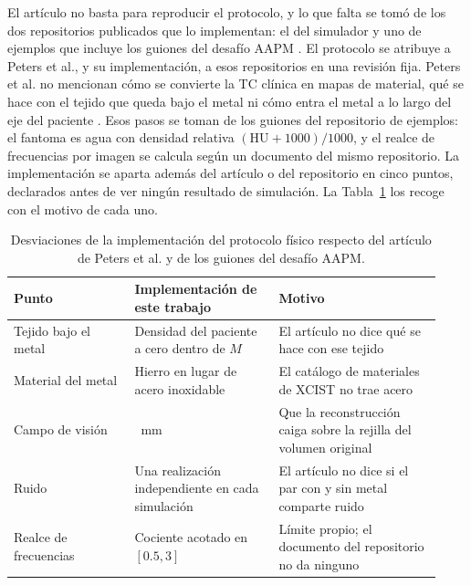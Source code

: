 El artículo no basta para reproducir el protocolo, y lo que falta se tomó de los dos repositorios publicados que lo implementan: el del simulador \cite{xcist2026main} y uno de ejemplos que incluye los guiones del desafío AAPM \cite{xcist2025example}. El protocolo se atribuye a Peters et al., y su implementación, a esos repositorios en una revisión fija. Peters et al. no mencionan cómo se convierte la TC clínica en mapas de material, qué se hace con el tejido que queda bajo el metal ni cómo entra el metal a lo largo del eje del paciente \cite{peters2025hybrid}. Esos pasos se toman de los guiones del repositorio de ejemplos: el fantoma es agua con densidad relativa $(\mathrm{HU} + 1000)/1000$, y el realce de frecuencias por imagen se calcula según un documento del mismo repositorio. La implementación se aparta además del artículo o del repositorio en cinco puntos, declarados antes de ver ningún resultado de simulación. La Tabla~\ref{tab:desviaciones} los recoge con el motivo de cada uno.

\begin{table}[htbp]
\centering
\small
\caption{Desviaciones de la implementación del protocolo físico respecto del artículo de Peters et al. y de los guiones del desafío AAPM.}
\label{tab:desviaciones}
\setlength{\tabcolsep}{5pt}\renewcommand{\arraystretch}{1.1}
\begin{tabular}{>{\raggedright\arraybackslash}p{0.262\linewidth} >{\raggedright\arraybackslash}p{0.3158\linewidth} >{\raggedright\arraybackslash}p{0.3509\linewidth}}
\hline
\textbf{Punto} & \textbf{Implementación de este trabajo} & \textbf{Motivo} \\
\hline
Tejido bajo el metal & Densidad del paciente a cero dentro de $M$ & El artículo no dice qué se hace con ese tejido \\
Material del metal & Hierro en lugar de acero inoxidable & El catálogo de materiales de XCIST no trae acero \\
Campo de visión & 459~mm & Que la reconstrucción caiga sobre la rejilla del volumen original \\
Ruido & Una realización independiente en cada simulación & El artículo no dice si el par con y sin metal comparte ruido \\
Realce de frecuencias & Cociente acotado en $[0.5, 3]$ & Límite propio; el documento del repositorio no da ninguno \\
\hline
\end{tabular}
\end{table}

